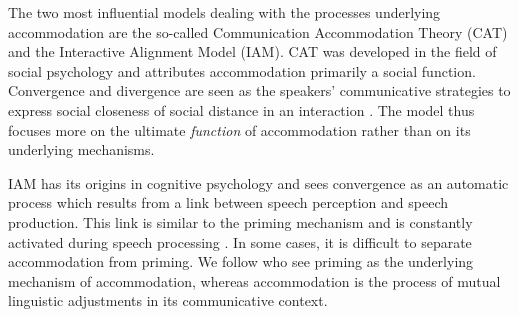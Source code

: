 \documentclass[output=paper,
modfonts
]{langscibook}
\begin{document}
The two most influential models dealing with the processes underlying accommodation are the so-called Communication Accommodation Theory (CAT) and the Interactive Alignment Model (IAM).
CAT \citep{giles_accent_1973,giles_towards_1973,giles_speech_1975} was developed in the field of social psychology and attributes accommodation primarily a social function. Convergence and divergence are seen as the speakers' communicative strategies to express social closeness of social distance in an interaction \citep[293]{giles_communication_2007}. The model thus focuses more on the ultimate \textit{function} of accommodation rather than on its underlying mechanisms.
% 
% 
% 
% 
% 

IAM \citep{pickering_toward_2004} has its origins in cognitive psychology and sees convergence as an automatic process which results from a link between speech perception and speech production. This link is similar to the priming mechanism and is constantly activated during speech processing \citep{pickering_toward_2004}. In some cases, it is difficult to separate accommodation from priming. We follow \cite{pickering_toward_2004} who see priming as the underlying mechanism of accommodation, whereas accommodation is the process of mutual linguistic adjustments in its communicative context.
% 
% 
% 
% 
\end{document}
